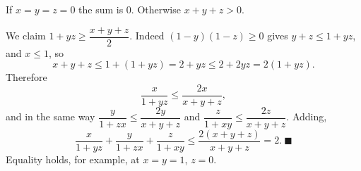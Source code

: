 If $x=y=z=0$ the sum is $0$. Otherwise $x+y+z>0$.

We claim $1+yz\ge\dfrac{x+y+z}{2}$. Indeed $(1-y)(1-z)\ge0$ gives $y+z\le1+yz$, and $x\le1$, so
\[x+y+z\le1+(1+yz)=2+yz\le2+2yz=2(1+yz).\]
Therefore
\[\dfrac{x}{1+yz}\le\dfrac{2x}{x+y+z},\]
and in the same way $\dfrac{y}{1+zx}\le\dfrac{2y}{x+y+z}$ and $\dfrac{z}{1+xy}\le\dfrac{2z}{x+y+z}$. Adding,
\[\dfrac{x}{1+yz}+\dfrac{y}{1+zx}+\dfrac{z}{1+xy}\le\dfrac{2(x+y+z)}{x+y+z}=2.\ \blacksquare\]
Equality holds, for example, at $x=y=1$, $z=0$.
